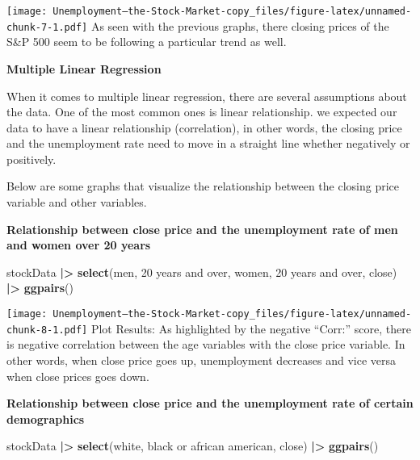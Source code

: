 \documentclass[
]{article}
\newenvironment{Shaded}{\begin{snugshade}}{\end{snugshade}}
\newcommand{\AttributeTok}[1]{\textcolor[rgb]{0.13,0.29,0.53}{#1}}
\newcommand{\FunctionTok}[1]{\textcolor[rgb]{0.13,0.29,0.53}{\textbf{#1}}}
\newcommand{\NormalTok}[1]{#1}
\newcommand{\SpecialCharTok}[1]{\textcolor[rgb]{0.81,0.36,0.00}{\textbf{#1}}}
\newcommand{\StringTok}[1]{\textcolor[rgb]{0.31,0.60,0.02}{#1}}
\begin{document}
\texttt{[image: Unemployment---the-Stock-Market-copy\_files/figure-latex/unnamed-chunk-7-1.pdf]}
As seen with the previous graphs, there closing prices of the S\&P 500
seem to be following a particular trend as well.

\textbf{Multiple Linear Regression}

When it comes to multiple linear regression, there are several
assumptions about the data. One of the most common ones is linear
relationship. we expected our data to have a linear relationship
(correlation), in other words, the closing price and the unemployment
rate need to move in a straight line whether negatively or positively.

Below are some graphs that visualize the relationship between the
closing price variable and other variables.

\textbf{Relationship between close price and the unemployment rate of
men and women over 20 years}

\begin{Shaded}
\begin{Highlighting}[]
\NormalTok{stockData }\SpecialCharTok{|\textgreater{}}
  \FunctionTok{select}\NormalTok{(}\StringTok{\textasciigrave{}}\AttributeTok{men, 20 years and over}\StringTok{\textasciigrave{}}\NormalTok{, }\StringTok{\textasciigrave{}}\AttributeTok{women, 20 years and over}\StringTok{\textasciigrave{}}\NormalTok{, close) }\SpecialCharTok{|\textgreater{}}
  \FunctionTok{ggpairs}\NormalTok{()}
\end{Highlighting}
\end{Shaded}

\texttt{[image: Unemployment---the-Stock-Market-copy\_files/figure-latex/unnamed-chunk-8-1.pdf]}
Plot Results: As highlighted by the negative ``Corr:'' score, there is
negative correlation between the age variables with the close price
variable. In other words, when close price goes up, unemployment
decreases and vice versa when close prices goes down.

\textbf{Relationship between close price and the unemployment rate of
certain demographics}

\begin{Shaded}
\begin{Highlighting}[]
\NormalTok{stockData }\SpecialCharTok{|\textgreater{}}
  \FunctionTok{select}\NormalTok{(white, }\StringTok{\textasciigrave{}}\AttributeTok{black or african american}\StringTok{\textasciigrave{}}\NormalTok{, close) }\SpecialCharTok{|\textgreater{}}
  \FunctionTok{ggpairs}\NormalTok{()}
\end{Highlighting}
\end{Shaded}
\end{document}

